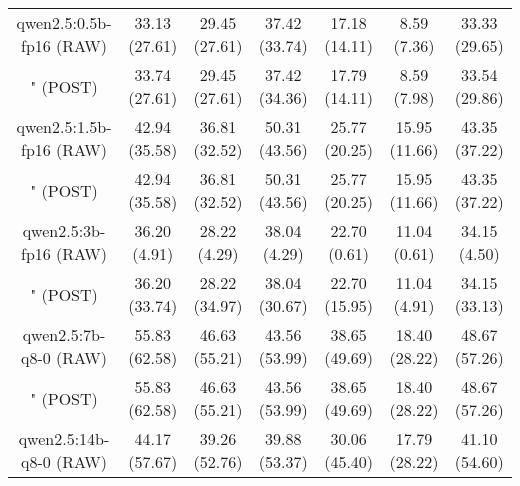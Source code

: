 \begin{table}[]
{\begin{tabular}{ccccccc}
        \multicolumn{1}{c|}{qwen2.5:0.5b-fp16 (RAW)} & 33.13 (27.61) & 29.45 (27.61) & \multicolumn{1}{c|}{37.42 (33.74)} & 17.18 (14.11) & \multicolumn{1}{c|}{8.59 (7.36)} & 33.33 (29.65) \\
        
        

        \multicolumn{1}{c|}{" (POST)} & 33.74 (27.61) & 29.45 (27.61) & \multicolumn{1}{c|}{37.42 (34.36)} & 17.79 (14.11) & \multicolumn{1}{c|}{8.59 (7.98)} & 33.54 (29.86) \\
        \cline{1-7}
        

        \multicolumn{1}{c|}{qwen2.5:1.5b-fp16 (RAW)} & 42.94 (35.58) & 36.81 (32.52) & \multicolumn{1}{c|}{50.31 (43.56)} & 25.77 (20.25) & \multicolumn{1}{c|}{15.95 (11.66)} & 43.35 (37.22) \\
        
        

        \multicolumn{1}{c|}{" (POST)} & 42.94 (35.58) & 36.81 (32.52) & \multicolumn{1}{c|}{50.31 (43.56)} & 25.77 (20.25) & \multicolumn{1}{c|}{15.95 (11.66)} & 43.35 (37.22) \\
        \cline{1-7}
        

        \multicolumn{1}{c|}{qwen2.5:3b-fp16 (RAW)} & 36.20 (4.91) & 28.22 (4.29) & \multicolumn{1}{c|}{38.04 (4.29)} & 22.70 (0.61) & \multicolumn{1}{c|}{11.04 (0.61)} & 34.15 (4.50) \\
        
        

        \multicolumn{1}{c|}{" (POST)} & 36.20 (33.74) & 28.22 (34.97) & \multicolumn{1}{c|}{38.04 (30.67)} & 22.70 (15.95) & \multicolumn{1}{c|}{11.04 (4.91)} & 34.15 (33.13) \\
        \cline{1-7}
        

        \multicolumn{1}{c|}{qwen2.5:7b-q8-0 (RAW)} & 55.83 (62.58) & 46.63 (55.21) & \multicolumn{1}{c|}{43.56 (53.99)} & 38.65 (49.69) & \multicolumn{1}{c|}{18.40 (28.22)} & 48.67 (57.26) \\
        
        

        \multicolumn{1}{c|}{" (POST)} & 55.83 (62.58) & 46.63 (55.21) & \multicolumn{1}{c|}{43.56 (53.99)} & 38.65 (49.69) & \multicolumn{1}{c|}{18.40 (28.22)} & 48.67 (57.26) \\
        \cline{1-7}
        

        \multicolumn{1}{c|}{qwen2.5:14b-q8-0 (RAW)} & 44.17 (57.67) & 39.26 (52.76) & \multicolumn{1}{c|}{39.88 (53.37)} & 30.06 (45.40) & \multicolumn{1}{c|}{17.79 (28.22)} & 41.10 (54.60) \\
        

\end{tabular}}
\end{table}
